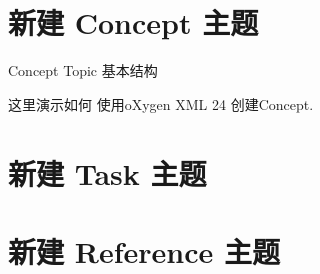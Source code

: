 \documentclass[letterpaper,10pt,english]{sphinxmanual}
\begin{document}
\section{新建 Concept 主题}
\label{\detokenize{dita/dita-quick-demo:concept}}
\sphinxAtStartPar
Concept Topic 基本结构

\begin{sphinxVerbatim}[commandchars=\\\{\}]
         
           
           
          
         
             
         
         
         
         
\end{sphinxVerbatim}

\sphinxAtStartPar
这里演示如何 使用oXygen XML 24 创建Concept.


\section{新建 Task 主题}
\label{\detokenize{dita/dita-quick-demo:task}}
\begin{sphinxVerbatim}[commandchars=\\\{\}]
 
      
      
      
      
           
                
                     
                     
                     
                
                
                
                
      
      
      
\end{sphinxVerbatim}


\section{新建 Reference 主题}
\label{\detokenize{dita/dita-quick-demo:reference}}
\end{document}
